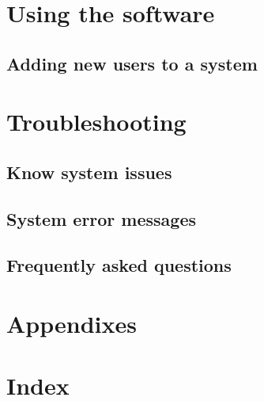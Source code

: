 \documentclass[a4paper,12pt]{article}
\begin{document}
    
    \section{Using the software}
    
    	\subsection{Adding new users to a system}
    	
    \section{Troubleshooting}
    
	    \subsection{Know system issues}
	    
	    \subsection{System error messages}
	    
	    \subsection{Frequently asked questions}
	    
    \section{Appendixes}
    
    \section{Index}
    
    \pagebreak  
\end{document}
